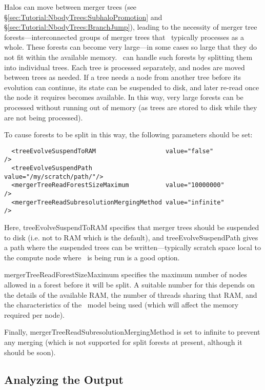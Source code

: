 Halos can move between merger trees (see \S\ref{sec:Tutorial:NbodyTrees:SubhaloPromotion} and \S\ref{sec:Tutorial:NbodyTrees:BranchJump}), leading to the necessity of merger tree forests---interconnected groups of merger trees that \glc\ typically processes as a whole. These forests can become very large---in some cases so large that they do not fit within the available memory. \glc\ can handle such forests by splitting them into individual trees. Each tree is processed separately, and nodes are moved between trees as needed. If a tree needs a node from another tree before its evolution can continue, its state can be suspended to disk, and later re-read once the node it requires becomes available. In this way, very large forests can be processed without running out of memory (as trees are stored to disk while they are not being processed).

To cause forests to be split in this way, the following parameters should be set:
\begin{verbatim}
  <treeEvolveSuspendToRAM                   value="false"            />
  <treeEvolveSuspendPath                    value="/my/scratch/path/"/>
  <mergerTreeReadForestSizeMaximum          value="10000000"         />
  <mergerTreeReadSubresolutionMergingMethod value="infinite"         />
\end{verbatim}

Here, {\normalfont \ttfamily treeEvolveSuspendToRAM} specifies that merger trees should be suspended to disk (i.e. not to RAM which is the default), and {\normalfont \ttfamily treeEvolveSuspendPath} gives a path where the suspended trees can be written---typically scratch space local to the compute node where \glc\ is being run is a good option.
 
{\normalfont \ttfamily mergerTreeReadForestSizeMaximum} specifies the maximum number of nodes allowed in a forest before it will be split. A suitable number for this depends on the details of the available RAM, the number of threads sharing that RAM, and the characteristics of the \glc\ model being used (which will affect the memory required per node).
 
Finally, {\normalfont \ttfamily mergerTreeReadSubresolutionMergingMethod} is set to {\normalfont \ttfamily infinite} to prevent any merging (which is not supported for split forests at present, although it should be soon).

\subsection{Analyzing the Output}

